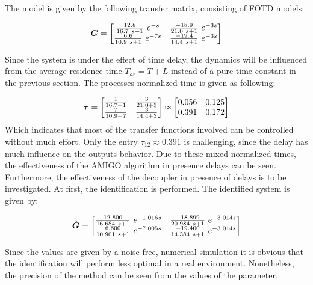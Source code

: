 The model is given by the following transfer matrix, consisting of FOTD models:

\begin{align*}
\mbox{\boldmath$G$} = \begin{bmatrix}
\frac{12.8}{16.7 ~s+1}~e^{-s}  & \frac{-18.9}{21.0 ~s+1}~e^{-3s}\\
\frac{6.6}{10.9 ~s+1}~e^{-7s} & \frac{-19.4}{14.4 ~s+1}~e^{-3s}
\end{bmatrix}
\end{align*} 

Since the system is under the effect of time delay, the dynamics will be influenced from the average residence time $T_{ar} = T + L$ instead of a pure time constant in the previous section. The processes normalized time is given as following:

\begin{align*}
\mbox{\boldmath$\tau$} = \begin{bmatrix}
\frac{1}{16.7+1} & \frac{3}{21.0+3} \\
\frac{7}{10.9+7} & \frac{3}{14.4+3}
\end{bmatrix} \approx \begin{bmatrix} 
0.056 & 0.125 \\
0.391 & 0.172
\end{bmatrix}
\end{align*}
Which indicates that most of the transfer functions involved can be controlled without much effort. Only the entry $\tau_{12} \approx 0.391$ is challenging, since the delay has much influence on the outputs behavior. Due to these mixed normalized times, the effectiveness of the AMIGO algorithm in presence delays can be seen. Furthermore, the effectiveness of the decoupler in presence of delays is to be investigated. At first, the identification is performed. The identified system is given by:

\begin{align*}
\hat{\mbox{\boldmath$G$}} = \begin{bmatrix}
\frac{12.800}{16.684 ~s+1}~e^{-1.016s}  & \frac{-18.899}{20.984 ~s+1}~e^{-3.014s}\\
\frac{6.600}{10.901 ~s+1}~e^{-7.005s} & \frac{-19.400}{14.384 ~s+1}~e^{-3.014s}
\end{bmatrix}
\end{align*} 

Since the values are given by a noise free, numerical simulation it is obvious that the identification will perform less optimal in a real environment. Nonetheless, the precision of the method can be seen from the values of the parameter.\\

